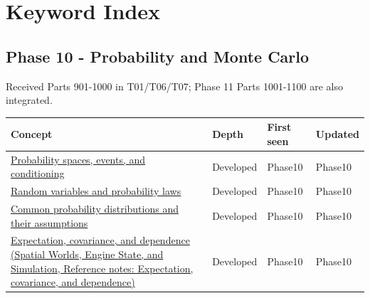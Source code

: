 \hypertarget{appendix-a6d556a4ef50}{}\label{referencestart:appendix-a6d556a4ef50}
\section{Keyword Index}\label{appendix-a6d556a4ef50-keyword-index}

\subsection{Phase 10 - Probability and Monte Carlo}\label{appendix-a6d556a4ef50-phase-10---probability-and-monte-carlo}

Received Parts 901-1000 in T01/T06/T07; Phase 11 Parts 1001-1100 are also integrated.

{\def\LTcaptype{none} %
\begin{longtable}[]{@{}
  >{\raggedright\arraybackslash}p{}
  >{\raggedright\arraybackslash}p{}
  >{\raggedright\arraybackslash}p{}
  >{\raggedright\arraybackslash}p{}@{}}
\toprule\noalign{}
\begin{minipage}[b]{\linewidth}\raggedright
Concept
\end{minipage} & \begin{minipage}[b]{\linewidth}\raggedright
Depth
\end{minipage} & \begin{minipage}[b]{\linewidth}\raggedright
First seen
\end{minipage} & \begin{minipage}[b]{\linewidth}\raggedright
Updated
\end{minipage} \\
\midrule\noalign{}
\endhead
\bottomrule\noalign{}
\endlastfoot
\hyperref[appendix-f1ef323f6ed7]{Probability spaces, events, and conditioning} & Developed & Phase10 & Phase10 \\
\hyperref[appendix-4d0203f7944f]{Random variables and probability laws} & Developed & Phase10 & Phase10 \\
\hyperref[appendix-a2360b435383]{Common probability distributions and their assumptions} & Developed & Phase10 & Phase10 \\
\href{../05-Spatial-Worlds-Engine-State-and-Simulation/main.pdf\#nameddest=appendix-54c383df9992}{Expectation, covariance, and dependence (Spatial Worlds, Engine State, and Simulation, Reference notes: Expectation, covariance, and dependence)} & Developed & Phase10 & Phase10 \\

\end{longtable}}
